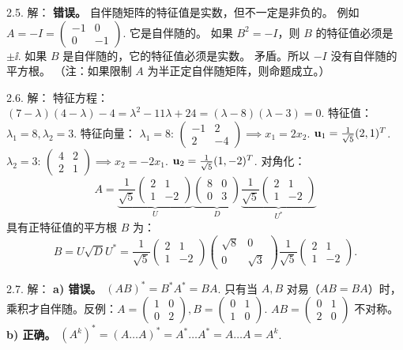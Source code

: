 \begin{exer}
2.5. 解：
\textbf{错误。}
自伴随矩阵的特征值是实数，但不一定是非负的。
例如 $A = -I = \begin{pmatrix} -1 & 0 \\ 0 & -1 \end{pmatrix}$. 它是自伴随的。
如果 $B^2 = -I$，则 $B$ 的特征值必须是 $\pm \ii$.
如果 $B$ 是自伴随的，它的特征值必须是实数。
矛盾。所以 $-I$ 没有自伴随的平方根。
（注：如果限制 $A$ 为半正定自伴随矩阵，则命题成立。）

2.6. 解：
特征方程：$(7-\lambda)(4-\lambda) - 4 = \lambda^2 - 11\lambda + 24 = (\lambda - 8)(\lambda - 3) = 0$.
特征值：$\lambda_1 = 8, \lambda_2 = 3$.
特征向量：
$\lambda_1 = 8$: $\begin{pmatrix} -1 & 2 \\ 2 & -4 \end{pmatrix} \implies x_1 = 2x_2$. $\mathbf{u}_1 = \frac{1}{\sqrt{5}}(2, 1)^T$.
$\lambda_2 = 3$: $\begin{pmatrix} 4 & 2 \\ 2 & 1 \end{pmatrix} \implies x_2 = -2x_1$. $\mathbf{u}_2 = \frac{1}{\sqrt{5}}(1, -2)^T$.
对角化：
$$ A = \underbrace{\frac{1}{\sqrt{5}}\begin{pmatrix} 2 & 1 \\ 1 & -2 \end{pmatrix}}_{U} \underbrace{\begin{pmatrix} 8 & 0 \\ 0 & 3 \end{pmatrix}}_{D} \underbrace{\frac{1}{\sqrt{5}}\begin{pmatrix} 2 & 1 \\ 1 & -2 \end{pmatrix}}_{U^*} $$
具有正特征值的平方根 $B$ 为：
$$ B = U \sqrt{D} U^* = \frac{1}{\sqrt{5}}\begin{pmatrix} 2 & 1 \\ 1 & -2 \end{pmatrix} \begin{pmatrix} \sqrt{8} & 0 \\ 0 & \sqrt{3} \end{pmatrix} \frac{1}{\sqrt{5}}\begin{pmatrix} 2 & 1 \\ 1 & -2 \end{pmatrix}. $$

2.7. 解：
\textbf{a) 错误。} $(AB)^* = B^* A^* = BA$. 只有当 $A, B$ 对易（$AB=BA$）时，乘积才自伴随。反例：$A=\begin{pmatrix} 1 & 0 \\ 0 & 2 \end{pmatrix}, B=\begin{pmatrix} 0 & 1 \\ 1 & 0 \end{pmatrix}$. $AB = \begin{pmatrix} 0 & 1 \\ 2 & 0 \end{pmatrix}$ 不对称。\\
\textbf{b) 正确。} $(A^k)^* = (A \dots A)^* = A^* \dots A^* = A \dots A = A^k$.


\end{exer}
